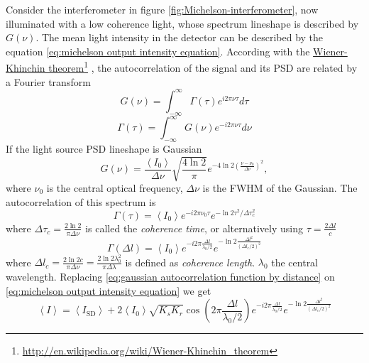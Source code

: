\documentclass[12pt,twoside,english]{book}
\renewcommand{\~}{\perispomeni}%
\numberwithin{equation}{section}
\numberwithin{figure}{section}
\newcommand\fnurl[2]{%
 \href{#2}{#1}\footnote{\url{#2}}%
}
\begin{document}
Consider the interferometer in figure \ref{fig:Michelson-interferometer}, now illuminated with a low coherence light, whose spectrum lineshape is described by $G\left(\nu\right)$. The mean light intensity in the detector can be described by the equation \ref{eq:michelson output intensity equation}. According with the \fnurl{Wiener-Khinchin theorem}{http://en.wikipedia.org/wiki/Wiener-Khinchin_theorem}, the autocorrelation of the signal and its \gls{PSD} are related by a Fourier transform
\begin{equation}
G\left(\nu\right)=\int_{-\infty}^{\infty}\Gamma\left(\tau\right)e^{i2\pi\nu\tau}d\tau\label{eq:spectrum from autocorrelation}\end{equation}
\begin{equation}
\Gamma\left(\tau\right)=\int_{-\infty}^{\infty}G\left(\nu\right)e^{-i2\pi\nu\tau}d\nu\label{eq:autocorrelation from spectrum}\end{equation}
If the light source \gls{PSD} lineshape is Gaussian
\begin{equation} G\left(\nu\right)=\frac{\left\langle I_{0}\right\rangle }{\Delta\nu}\sqrt{\frac{4\ln2}{\pi}}e^{-4\ln2\left(\frac{\nu-\nu_{0}}{\Delta\nu}\right)^{2}},\label{eq:gaussian spectrum}\end{equation}
where $\nu_{0}$ is the central optical frequency, $\Delta\nu$ is the \gls{FWHM} of the Gaussian. The autocorrelation of this spectrum is
\begin{equation}
\Gamma\left(\tau\right)=\left\langle I_{0}\right\rangle e^{-i2\pi\nu_{0}\tau}e^{-\ln2\tau^{2}/\Delta\tau_{c}^{2}}\label{eq:gaussian autocorrelation function}\end{equation}
where $\Delta\tau_{c}=\frac{2\ln2}{\pi\Delta\nu}$ is called the \emph{coherence time}, or alternatively using $\tau=\frac{2\Delta l}{c}$
\begin{equation}
\Gamma\left(\Delta l\right)=\left\langle I_{0}\right\rangle e^{-i2\pi\frac{\Delta l}{\lambda_{0}/2}}e^{-\ln2\frac{\Delta l^{2}}{\left(\Delta l_{c}/2\right)^{2}}}\label{eq:gaussian autocorrelation function by distance}\end{equation}
where $\Delta l_{c}=\frac{2\ln2c}{\pi\Delta\nu}=\frac{2\ln2\lambda_{0}^{2}}{\pi\Delta\lambda}$ is defined as \emph{coherence length}. $\lambda_{0}$ the central wavelength. Replacing \ref{eq:gaussian autocorrelation function by distance} on \ref{eq:michelson output intensity equation} we get
\begin{equation} \left\langle I\right\rangle =\left\langle I_{\text{SD}}\right\rangle +2\left\langle I_{0}\right\rangle \sqrt{K_{s}K_{r}}\cos\left(2\pi\frac{\Delta l}{\lambda_{0}/2}\right)e^{-i2\pi\frac{\Delta l}{\lambda_{0}/2}}e^{-\ln2\frac{\Delta l^{2}}{\left(\Delta l_{c}/2\right)^{2}}}\label{eq:gaussianInterferogram}\end{equation}
\end{document}
